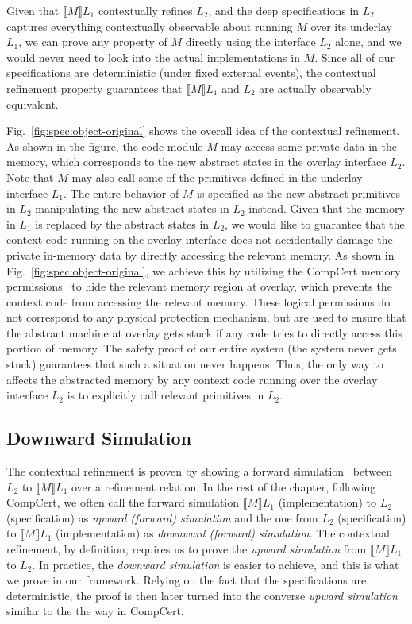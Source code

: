 Given that $\llbracket{}M\rrbracket{}L_1$ contextually refines $L_2$,
and the deep specifications in $L_2$ captures everything contextually observable
about running $M$ over its underlay $L_1$, we can prove any property of $M$ directly using
the interface $L_2$ alone, and we would never need to look into the actual
implementations in $M$. Since all of our specifications are deterministic
(under fixed external events), the contextual refinement property guarantees
that $\llbracket{}M\rrbracket{}L_1$ and $L_2$ are actually observably equivalent.

Fig.~\ref{fig:spec:object-original} shows the overall idea of the contextual
refinement. As shown in the figure, the code module $M$ may access some
private data in the memory, which corresponds to the new abstract states
in the overlay interface $L_2$. Note that $M$ may also call some of the
primitives defined in the underlay interface $L_1$. The entire behavior
of $M$ is specified as the new abstract primitives in $L_2$ manipulating
the new abstract states in $L_2$ instead. Given that the memory in $L_1$
is replaced by the abstract states in $L_2$, we would like to 
guarantee that the context
code running on the overlay interface does not accidentally damage the private
in-memory data by directly accessing the relevant memory. As shown in
Fig.~\ref{fig:spec:object-original}, we achieve this by utilizing the CompCert
memory permissions~\cite{leroy08} to hide the relevant memory region at overlay,
which prevents the context code from accessing the relevant memory. These
logical permissions do not correspond to any physical protection mechanism, but
are used to ensure that the abstract machine at overlay gets stuck if any code
tries to directly access this portion of memory. The safety proof of our entire
system (the system never gets stuck) guarantees that such a situation never
happens. Thus, the only way to affects the abstracted memory by any context code
running over the overlay interface $L_2$ is to explicitly call relevant
primitives in $L_2$.

\subsection{Downward Simulation}

The contextual refinement is proven by showing a forward
simulation~\cite{Lynch95} between $L_2$
to $\llbracket{}M\rrbracket{}L_1$ over a refinement relation.
In the rest of the chapter, following CompCert, we often call the
forward simulation $\llbracket{}M\rrbracket{}L_1$ (implementation)
to $L_2$ (specification) as {\em upward (forward) simulation} and
the one from $L_2$ (specification) to $\llbracket{}M\rrbracket{}L_1$
(implementation) as {\em downward (forward) simulation}.
The contextual refinement, by definition, requires us to prove
the {\em upward simulation} from $\llbracket{}M\rrbracket{}L_1$
to $L_2$. In practice, the {\em downward simulation} is easier to
achieve, and this is what we prove in our framework. Relying
on the fact that the specifications are deterministic, the proof
is then later turned into the converse {\em upward simulation}
similar to the the way in CompCert.

